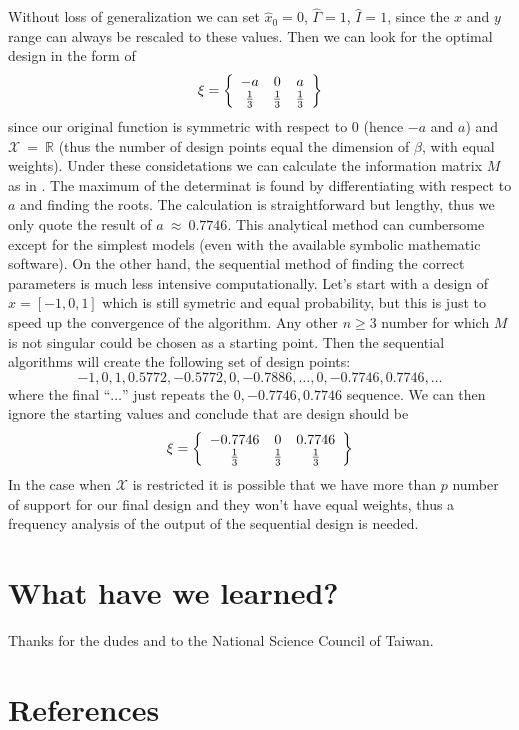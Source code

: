 \documentclass[12pt]{iopart}
\begin{document}
Without loss of generalization we can set $\hat x_0 = 0$, $\hat \Gamma = 1$, $\hat I = 1$, since the $x$ and $y$ range can always be rescaled to these values. Then we can look for the optimal design in the form of 
\begin{equation}
\xi = \left\{ 
  \begin{array}{c c c}
    -a & 0 & a\\
    \frac{1}{3} & \frac{1}{3} & \frac{1}{3}\\
  \end{array} \right \}
\end{equation}
since our original function is symmetric with respect to 0 (hence $-a$ and $a$) and $\mathcal{X}~=~\mathbb{R}$ (thus the number of design points equal the dimension of $\beta$, with equal weights). Under these considetations we can calculate the information matrix $M$ as in . The maximum of the determinat is found by differentiating with respect to $a$ and finding the roots. The calculation is straightforward but lengthy, thus we only quote the result of $a~\approx~0.7746$. This analytical method can cumbersome except for the simplest models (even with the available symbolic mathematic software). On the other hand, the sequential method of finding the correct parameters is much less intensive computationally. Let's start with a design of $x = [-1, 0, 1]$ which is still symetric and equal probability, but this is just to speed up the convergence of the algorithm. Any other $n \geq 3$ number for which $M$ is not singular could be chosen as a starting point. Then the sequential algorithms will create the following set of design points:
\begin{equation}
    -1, 0, 1, 0.5772, -0.5772, 0, -0.7886,\ldots,0,-0.7746,0.7746,\ldots
\end{equation}
where the final ``$\ldots$'' just repeats the $0,-0.7746,0.7746$ sequence. We can then ignore the starting values and conclude that are design should be
\begin{equation}
\xi = \left\{ 
  \begin{array}{c c c}
    -0.7746 & 0 & 0.7746\\
    \frac{1}{3} & \frac{1}{3} & \frac{1}{3}\\
  \end{array} \right \}
\end{equation}
In the case when $\mathcal{X}$ is restricted it is possible that we have more than $p$ number of support for our final design and they won't have equal weights, thus a frequency analysis of the output of the sequential design is needed.



\section{What have we learned?}

\ack Thanks for the dudes and to the National Science Council of Taiwan.

\section*{References}


\end{document}
